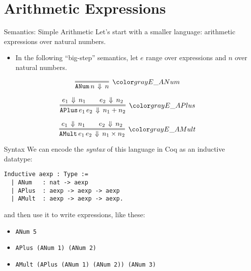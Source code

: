 \section{Arithmetic Expressions}
\frame{\tableofcontents[currentsection]}

\begin{frame}{Semantics: Simple Arithmetic}
Let's start with a smaller language: arithmetic expressions over natural
numbers.

\begin{itemize}
\item In the following ``big-step'' semantics, let $e$ range over expressions 
and $n$ over natural numbers.
\end{itemize}

\begin{block}{}
\[
\relrule{E\_ANum}{}{\evals{\co{ANum} n}{n}}
\]

\[
\relrule{E\_APlus}
  {\evals{e_1}{n_1} \qquad \evals{e_2}{n_2}}
  {\evals{\co{APlus} e_1 \, e_2}{n_1 + n_2}}
\]

\[
\relrule{E\_AMult}
  {\evals{e_1}{n_1} \qquad \evals{e_2}{n_2}}
  {\evals{\co{AMult} e_1 \, e_2}{n_1 \times n_2}}
\]
\end{block}
\end{frame}

\begin{frame}[fragile]{Syntax}
We can encode the \emph{syntax} of this language in Coq as an inductive
datatype:

\begin{block}{}
\begin{verbatim}
Inductive aexp : Type := 
  | ANum   : nat -> aexp
  | APlus  : aexp -> aexp -> aexp
  | AMult  : aexp -> aexp -> aexp.
\end{verbatim}
\end{block}

and then use it to write expressions, like these:

\begin{block}{}
\begin{itemize}
  \item\texttt{ANum 5}
  \item\texttt{APlus (ANum 1) (ANum 2)}
  \item\texttt{AMult (APlus (ANum 1) (ANum 2)) (ANum 3)}
\end{itemize}
\end{block}
\end{frame}

